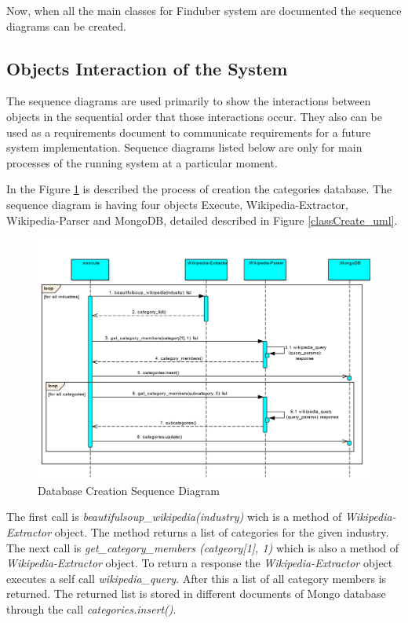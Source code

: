 Now, when all the main classes for Finduber system are documented the sequence diagrams can be created.

\subsection{Objects Interaction of the System}

The sequence diagrams are used primarily to show the interactions between objects in the sequential order that those interactions occur. They also can be used as a requirements document to communicate requirements for a future system implementation. Sequence diagrams listed below are only for main processes of the running system at a particular moment. 

In the Figure \ref{createDB_uml} is described the process of creation the categories database. The sequence diagram is having four objects Execute, Wikipedia-Extractor, Wikipedia-Parser and MongoDB, detailed described in Figure \ref{classCreate_uml}.

\begin{figure}[!ht]
\centering
\includegraphics[width=15cm]{CreateDB-1}
\caption{Database Creation Sequence Diagram}\label{createDB_uml}
\end{figure}

The first call is \textit{beautifulsoup\_wikipedia(industry)} wich is a method of \textit{Wikipedia-Extractor} object. The method returns a list of categories for the given industry. The next call is \textit{get\_category\_members (catgeory[1], 1)} which is also a method of \textit{Wikipedia-Extractor} object. To return a response the \textit{Wikipedia-Extractor} object executes a self call \textit{wikipedia\_query}. After this a list of all category members is returned. The returned list is stored in different documents of Mongo database through the call \textit{categories.insert()}.

